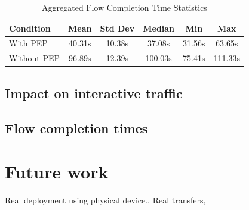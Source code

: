 \documentclass[a4paper,english, 11pt]{report}
\begin{document}
\begin{table}[h!]
\centering
\begin{tabular}{lccccc}
\toprule
Condition & Mean & Std Dev & Median & Min & Max \\
\midrule
With PEP & 40.31s & 10.38s & 37.08s & 31.56s & 63.65s\\
Without PEP & 96.89s & 12.39s & 100.03s & 75.41s & 111.33s\\

\bottomrule
\end{tabular}
\caption{Aggregated Flow Completion Time Statistics}
\label{tab:aggregated_fct_statistics}
\end{table} 

\subsection{Impact on interactive traffic}

\subsection{Flow completion times}

\section{Future work}
Real deployment using physical device.,
Real transfers,



{}

\end{document}
